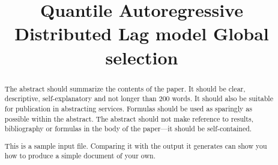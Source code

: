 \documentclass[aoas]{imsart}
\numberwithin{equation}{section}
\theoremstyle{plain}
\theoremstyle{remark}
\begin{document}
\begin{frontmatter}
\title{Quantile Autoregressive Distributed Lag model Global selection}
\runtitle{}



\begin{aug}


\author[A]{ 
  }
  

\address[A]{Instituto de Matemática e Estatística, Universidade Federal
do Rio Grande do Sul,
  }
\end{aug}

\begin{abstract}
The abstract should summarize the contents of the paper. It should be
clear, descriptive, self-explanatory and not longer than 200 words. It
should also be suitable for publication in abstracting services.
Formulas should be used as sparingly as possible within the abstract.
The abstract should not make reference to results, bibliography or
formulas in the body of the paper---it should be self-contained.

This is a sample input file. Comparing it with the output it generates
can show you how to produce a simple document of your own.
\end{abstract}


\begin{keyword}
\end{keyword}

\end{frontmatter}
\end{document}
